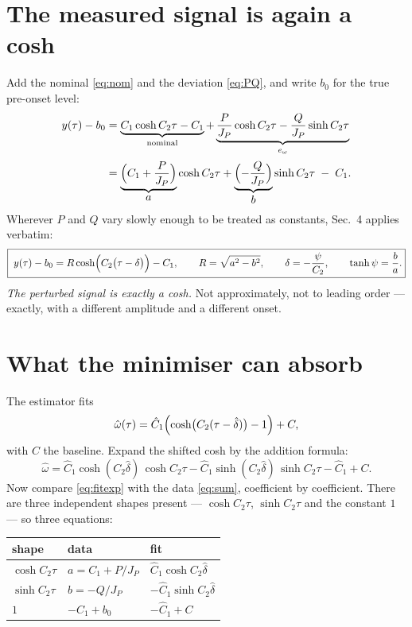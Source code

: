 \documentclass[11pt]{article}
\begin{document}
\section{The measured signal is again a cosh}

Add the nominal \eqref{eq:nom} and the deviation \eqref{eq:PQ}, and
write $b_0$ for the true pre-onset level:
\begin{align}
  y(\tau) - b_0
  &= \underbrace{C_1\cosh C_2\tau - C_1}_{\text{nominal}}
   + \underbrace{\frac{P}{J_P}\cosh C_2\tau
                - \frac{Q}{J_P}\sinh C_2\tau}_{e_\omega}
   \notag\\[2pt]
  &= \underbrace{\Bigl(C_1 + \frac{P}{J_P}\Bigr)}_{\textstyle a}
     \cosh C_2\tau
   + \underbrace{\Bigl(-\frac{Q}{J_P}\Bigr)}_{\textstyle b}
     \sinh C_2\tau \;-\; C_1 .
  \label{eq:sum}
\end{align}
Wherever $P$ and $Q$ vary slowly enough to be treated as constants,
Sec.~4 applies verbatim:
\begin{equation}
  \boxed{\;
  y(\tau) - b_0 = R\cosh\Bigl(C_2\bigl(\tau - \delta\bigr)\Bigr) - C_1,
  \qquad
  R = \sqrt{a^2 - b^2},
  \qquad
  \delta = -\frac{\psi}{C_2},
  \qquad \tanh\psi = \frac{b}{a}. }
  \label{eq:asfit}
\end{equation}
\emph{The perturbed signal is exactly a cosh.} Not approximately, not to
leading order --- exactly, with a different amplitude and a different
onset.

\section{What the minimiser can absorb}

The estimator fits
\begin{equation}
  \hat\omega(\tau) = \hat C_1\Bigl(\cosh\bigl(C_2(\tau-\hat\delta)\bigr)
                                   - 1\Bigr) + C ,
  \label{eq:fit}
\end{equation}
with $C$ the baseline. Expand the shifted cosh by the addition formula:
\begin{equation}
  \hat\omega
   = \hat C_1\cosh(C_2\hat\delta)\,\cosh C_2\tau
   - \hat C_1\sinh(C_2\hat\delta)\,\sinh C_2\tau
   - \hat C_1 + C .
  \label{eq:fitexp}
\end{equation}
Now compare \eqref{eq:fitexp} with the data \eqref{eq:sum}, coefficient
by coefficient. There are three independent shapes present ---
$\cosh C_2\tau$, $\sinh C_2\tau$ and the constant $1$ --- so three
equations:
\begin{center}\small
\begin{tabular}{@{}lll@{}}
\toprule
shape & data & fit \\
\midrule
$\cosh C_2\tau$ & $a = C_1 + P/J_P$ & $\hat C_1\cosh C_2\hat\delta$ \\
$\sinh C_2\tau$ & $b = -Q/J_P$      & $-\hat C_1\sinh C_2\hat\delta$ \\
$1$             & $-C_1 + b_0$      & $-\hat C_1 + C$ \\
\bottomrule
\end{tabular}
\end{center}
\end{document}
